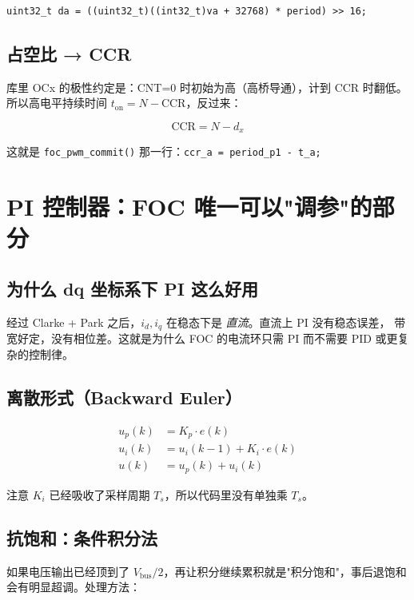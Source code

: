 \documentclass[UTF8,a4paper,11pt]{ctexart}
\newcommand{\code}[1]{\texttt{#1}}
\begin{document}
\begin{lstlisting}
uint32_t da = ((uint32_t)((int32_t)va + 32768) * period) >> 16;
\end{lstlisting}

\subsection{占空比 → CCR}

库里 OCx 的极性约定是：CNT=0 时初始为高（高桥导通），计到 CCR 时翻低。
所以高电平持续时间 $t_\text{on} = N - \text{CCR}$，反过来：

\[
\boxed{\;\text{CCR} = N - d_x\;}
\]

这就是 \code{foc\_pwm\_commit()} 那一行：\code{ccr\_a = period\_p1 - t\_a;}

\section{PI 控制器：FOC 唯一可以"调参"的部分}

\subsection{为什么 dq 坐标系下 PI 这么好用}

经过 Clarke + Park 之后，$i_d, i_q$ 在稳态下是 \emph{直流}。直流上 PI 没有稳态误差，
带宽好定，没有相位差。这就是为什么 FOC 的电流环只需 PI 而不需要 PID 或更复杂的控制律。

\subsection{离散形式（Backward Euler）}

\begin{align*}
u_p(k) &= K_p \cdot e(k) \\
u_i(k) &= u_i(k-1) + K_i \cdot e(k) \\
u(k)   &= u_p(k) + u_i(k)
\end{align*}

注意 $K_i$ 已经吸收了采样周期 $T_s$，所以代码里没有单独乘 $T_s$。

\subsection{抗饱和：条件积分法}

如果电压输出已经顶到了 $V_\text{bus}/2$，再让积分继续累积就是"积分饱和"，事后退饱和
会有明显超调。处理方法：
\end{document}
